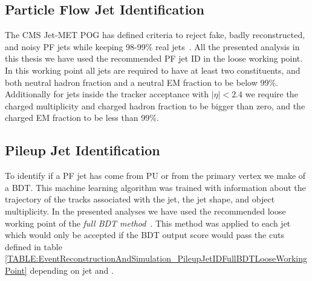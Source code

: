 
\subsection{Particle Flow Jet Identification} 
\label{SECTION:EventReconstructionAndSimulation_Jets_ParticleFlowJetID}



The \gls{CMS} Jet-MET \gls{POG} has defined criteria to reject fake, badly reconstructed, and noisy \gls{PF} jets while keeping 98-99\% real jets~\cite{ARTICLE:CMSAN-14-227}. All the presented analysis in this thesis we have used the recommended \gls{PF} jet \gls{ID} in the loose working point. In this working point all jets are required to have at least two constituents, and both neutral hadron fraction and a neutral \gls{EM} fraction to be below 99\%. Additionally for jets inside the tracker acceptance with $|\eta| < 2.4$ we require the charged multiplicity and charged hadron fraction to be bigger than zero, and the charged \gls{EM} fraction to be less than 99\%.

\subsection{Pileup Jet Identification}
\label{SECTION:EventReconstructionAndSimulation_Jets_PileupJetID}



To identify if a \gls{PF} jet has come from \gls{PU} or from the primary vertex we make of a \gls{BDT}. This machine learning algorithm was trained with information about the trajectory of the tracks associated with the jet, the jet shape, and object multiplicity. In the presented analyses we have used the recommended loose working point of the \textit{full \gls{BDT} method}~\cite{ARTICLE:CMS-PAS-JME-13-005}. This method was applied to each jet which would only be accepted if the \gls{BDT} output score would pass the cuts defined in table \ref{TABLE:EventReconstructionAndSimulation_PileupJetIDFullBDTLooseWorkingPoint} depending on jet \pt and \eta.

